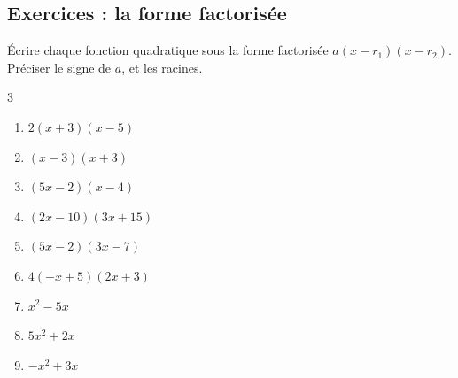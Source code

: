 \documentclass[main.tex]{subfiles}
\begin{document}
\subsection*{Exercices : la forme factorisée}
\begin{exercise}\label{chapitre01:exercice:factorise:01} Écrire chaque fonction quadratique sous la forme factorisée $a(x-r_1)(x-r_2)$.\\
Préciser le signe de $a$, et les racines.\vspace{-1em}

\begin{multicols}{3} 
\begin{enumerate}[label={$f_\arabic*(x)=$\rule{0pt}{1.8em}}, leftmargin=*] 
	\item $2(x+3)(x-5)$
	\item $(x-3)(x+3)$ 
	\item $(5x-2)(x-4)$ 
	\item $(2x-10)(3x+15)$
	\item $(5x-2)(3x-7)$
	\item $4(-x+5)(2x+3)$ 
	\item $x^2-5x$
	\item $5x^2+2x$
	\item $-x^2+3x$
\end{enumerate}
\end{multicols} 
\end{exercise}
\end{document}
